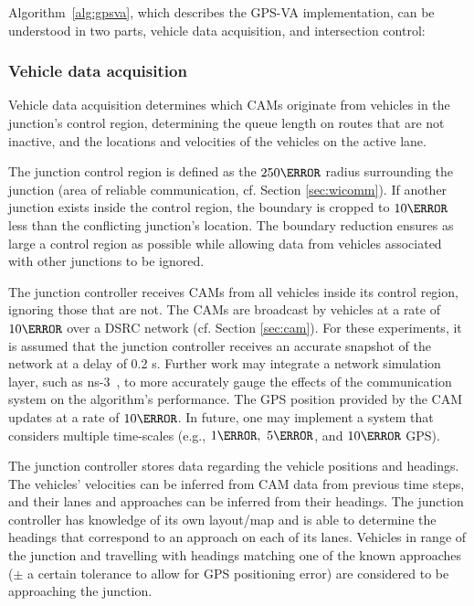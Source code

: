 \documentclass[numbered]{trbunofficial}
\begin{document}
Algorithm~\ref{alg:gpsva}, which describes the GPS-VA implementation, can be understood in two parts, vehicle data acquisition, and intersection control:

\subsubsection{Vehicle data acquisition}
Vehicle data acquisition determines which CAMs originate from vehicles in the junction's control region, determining the queue length on routes that are not inactive, and the locations and velocities of the vehicles on the active lane.

The junction control region is defined as the $250\m$ radius surrounding the junction (area of reliable communication, cf. Section \ref{sec:wicomm}). If another junction exists inside the control region, the boundary is cropped to $10\m$ less than the conflicting junction's location. The boundary reduction ensures as large a control region as possible while allowing data from vehicles associated with other junctions to be ignored. 

The junction controller receives CAMs from all vehicles inside its control region, ignoring those that are not. The CAMs are broadcast by vehicles at a rate of $10\Hz$ over a DSRC network (cf. Section \ref{sec:cam}). For these experiments, it is assumed that the junction controller receives an accurate snapshot of the network at a delay of 0.2 s. Further work may integrate a network simulation layer, such as ns-3~\cite{Riley2010}, to more accurately gauge the effects of the communication system on the algorithm's performance. The GPS position provided by the CAM updates at a rate of $10\Hz$. In future, one may implement a system that considers multiple time-scales (e.g., $1\Hz,\ 5\Hz$, and $10\Hz$ GPS).

The junction controller stores data regarding the vehicle positions and headings. The vehicles' velocities can be inferred from CAM data from previous time steps, and their lanes and approaches can be inferred from their headings. The junction controller has knowledge of its own layout/map and is able to determine the headings that correspond to an approach on each of its lanes. Vehicles in range of the junction and travelling with headings matching one of the known approaches ($\pm$ a certain tolerance to allow for GPS positioning error) are considered to be approaching the junction.
\end{document}
